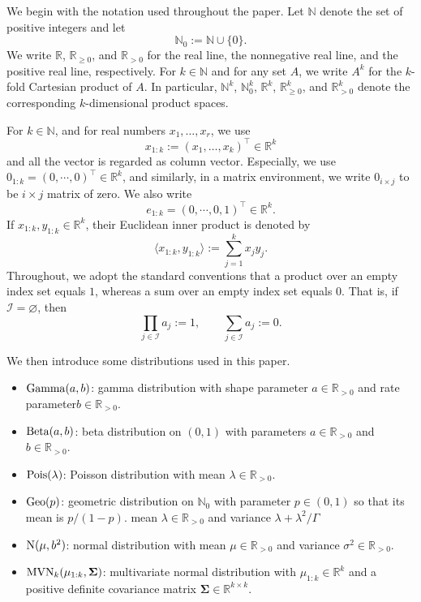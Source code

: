\documentclass[11pt,authoryear]{elsarticle}
\def\Real{\mathbb{R}}
\theoremstyle{nopunct}
\numberwithin{equation}{section}
\begin{document}
We begin with the notation used throughout the paper. Let \(\mathbb N\) denote
the set of positive integers and let
\[
\mathbb N_0:=\mathbb N\cup\{0\}.
\]
We write \(\Real\), \(\Real_{\ge0}\), and \(\Real_{>0}\) for the real line,
the nonnegative real line, and the positive real line, respectively. For \(k\in\mathbb N\) and for any set \(A\), we write
\(
A^k
\)
for the \(k\)-fold Cartesian product of \(A\). In particular,
\(\mathbb N^k\), \(\mathbb N_0^k\), \(\Real^k\),
\(\Real_{\ge0}^k\), and \(\Real_{>0}^k\) denote the corresponding
\(k\)-dimensional product spaces. 

For \(k\in\mathbb N\), and for real numbers \(x_1,\ldots,x_r\), we use 
\[
x_{1:k}:=(x_1,\ldots,x_k)^\top\in\Real^k
\]
and all the vector is regarded as column vector. 
Especially, we use $0_{1:k}=(0, \cdots, 0)^\top\in\Real^k$, 
and similarly, 
in a matrix environment, we write
\(
0_{i\times j}
\) to be $i\times j$ matrix of zero. 
We also write
\[
e_{1:k} = (0, \cdots, 0, 1)^\top\in\Real^k.
\]
If \(x_{1:k},y_{1:k}\in\Real^k\), their Euclidean inner product is denoted by
\[
\langle x_{1:k},y_{1:k}\rangle
:=
\sum_{j=1}^{k}x_jy_j.
\]
Throughout, we adopt the standard conventions that a product over an
empty index set equals \(1\), whereas a sum over an empty index set
equals \(0\). That is, if \(\mathcal I=\varnothing\), then
\[
\prod_{j\in\mathcal I} a_j:=1,
\qquad
\sum_{j\in\mathcal I} a_j:=0.
\]


We then introduce some distributions used in this paper.
\begin{itemize}
  \setlength\itemsep{0em}
	\item ${\rm Gamma}(a, b)$: gamma distribution with shape parameter $a\in\Real_{>0}$  and
	rate  parameter$b\in\Real_{>0}$. 
	\item ${\rm Beta}(a, b)$: beta distribution on $(0,1)$ with parameters $a\in\Real_{>0}$ and $b\in\Real_{>0}$.
	\item ${\rm Pois}( \lambda)$: Poisson distribution
 with mean $\lambda\in\Real_{>0}$.
\item ${\rm Geo}(p)$: geometric distribution on \(\mathbb N_0\) with parameter
\(p\in(0,1)\) so that its mean is \(p/(1-p)\).
	 mean $\lambda\in\Real_{>0}$ and variance  $\lambda + \lambda^2/\Gamma$ 
\item ${\rm N}(\mu, b^2)$: normal distribution with mean $\mu\in\Real_{>0}$ and variance $\sigma^2\in\Real_{>0}$.
\item ${\rm MVN}_k(\mu_{1:k}, \boldsymbol\Sigma)$: multivariate normal distribution with \(\mu_{1:k}\in\Real^k\) and
a positive definite covariance matrix \(\boldsymbol\Sigma\in\Real^{k\times k}\). 


\end{itemize}
\end{document}
